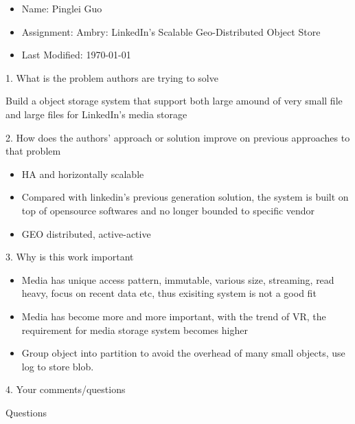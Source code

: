 \documentclass[12pt,a4paper,oneside]{article}
\begin{document}
\begin{itemize}
  \item Name: Pinglei Guo
  \item Assignment: Ambry: LinkedIn's Scalable Geo-Distributed Object Store
  \item Last Modified: \today
\end{itemize}

1. What is the problem authors are trying to solve

\medskip

Build a object storage system that support both large amound of very small file and large files for LinkedIn's media storage

\bigskip

2. How does the authors’ approach or solution improve on previous approaches to that problem

\medskip

\begin{itemize}
  \item HA and horizontally scalable
  \item Compared with linkedin's previous generation solution, the system is built on top of opensource softwares and no longer bounded to specific vendor
  \item GEO distributed, active-active
\end{itemize}

\bigskip

3. Why is this work important

\medskip

\begin{itemize}
  \item Media has unique access pattern, immutable, various size, streaming, read heavy, focus on recent data etc, thus exisiting system is not a good fit
  \item Media has become more and more important, with the trend of VR, the requirement for media storage system becomes higher
  \item Group object into partition to avoid the overhead of many small objects, use log to store blob.
\end{itemize}

\bigskip

4. Your comments/questions

\medskip

Questions
\end{document}
